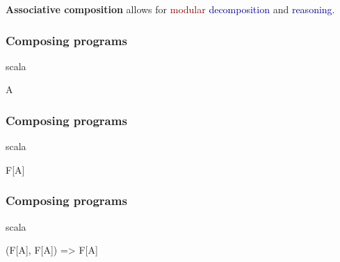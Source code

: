 \documentclass{beamer}
\begin{document}

\begin{frame}
  \centering


\end{frame}


\begin{frame}
  \centering
  \Large

  \textbf{Associative composition}
  allows for \textcolor{darkred}{modular}
  \textcolor{darkblue}{decomposition} and \textcolor{darkblue}{reasoning}.
\end{frame}

\begin{frame}[fragile]

  \frametitle{Composing programs}

  \centering
  \Large

  \begin{cminted}{scala}

A

  \end{cminted}

\end{frame}

\begin{frame}[fragile]

  \frametitle{Composing programs}

  \centering
  \Large

  \begin{cminted}{scala}

F[A]

  \end{cminted}

\end{frame}

\begin{frame}[fragile]

  \frametitle{Composing programs}

  \centering
  \Large

  \begin{cminted}{scala}

(F[A], F[A]) => F[A]

  \end{cminted}

\end{frame}
\end{document}

